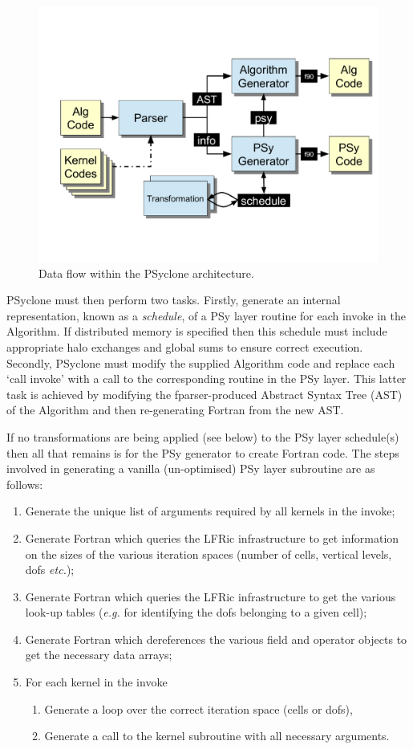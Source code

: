 \documentclass[review,times]{elsarticle}
\begin{document}
\begin{figure}
\centering\includegraphics[width=0.8\linewidth]{Fig5_psyclone_flow.pdf}
\caption{\label{fig:psyclone-arch}Data flow within the PSyclone architecture.}
\end{figure}

PSyclone must then perform two tasks. Firstly, generate an internal
representation, known as a {\em schedule}, of a PSy layer routine for each invoke in
the Algorithm. If distributed memory is specified then this schedule
must include appropriate halo exchanges and global sums to ensure
correct execution. Secondly, PSyclone must modify the supplied Algorithm
code and replace each `call invoke' with a call to the corresponding
routine in the PSy layer. This latter task is achieved by modifying
the fparser-produced Abstract Syntax Tree (AST) of the Algorithm and
then re-generating Fortran from the new AST.

If no transformations are being applied (see below) to the PSy layer
schedule(s) then all that remains is for the PSy generator to create
Fortran code.  The steps involved in generating a vanilla
(un-optimised) PSy layer subroutine are as follows:
\begin{enumerate}
\item Generate the unique list of arguments required by all kernels
  in the invoke;
\item Generate Fortran which queries the LFRic infrastructure to get
  information on the sizes of the various iteration spaces (number of cells,
  vertical levels, dofs {\em etc.});
\item Generate Fortran which queries the LFRic infrastructure to get the
  various look-up tables ({\em e.g.} for identifying the dofs belonging to a
  given cell);
\item Generate Fortran which dereferences the various field and operator
  objects to get the necessary data arrays;
\item For each kernel in the invoke
  \begin{enumerate}
    \item Generate a loop over the correct iteration space (cells or dofs),
    \item Generate a call to the kernel subroutine with all necessary arguments.
  \end{enumerate}
\end{enumerate}
\end{document}
